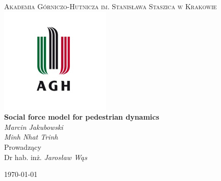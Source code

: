 \begin{titlepage}
	\centering
	{\scshape\LARGE Akademia Górniczo-Hutnicza im. Stanisława Staszica w Krakowie \\}
	\includegraphics{logoUniversity.jpg}\\
	\vspace{1cm}
	\vspace{1cm}
	{\huge\bfseries Social force model for pedestrian dynamics\\}
	\vspace{2cm}
	{\Large\itshape 
		Marcin Jakubowski\\
		Minh Nhat Trinh\\
	}
	\vfill
	Prowadzący\\
	Dr hab. inż. {\it Jarosław Wąs}
	\vfill

	{\large \today\\}
\end{titlepage}

